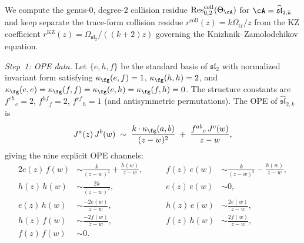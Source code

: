 \begin{computation}
\label{comp:sl2-collision-residue-kz}
We compute the genus-$0$, degree-$2$ collision residue
$\operatorname{Res}^{\mathrm{coll}}_{0,2}(\Theta_\cA)$
for $\cA = \widehat{\mathfrak{sl}}_{2,k}$ and keep separate the
trace-form collision residue
$r^{\mathrm{coll}}(z)=k\Omega_{\mathrm{tr}}/z$ from the KZ coefficient
$r^{\mathrm{KZ}}(z)=\Omega_{\mathfrak{sl}_2}/((k+2)z)$ governing the
Knizhnik--Zamolodchikov equation.

\emph{Step~1: OPE data.}
Let $\{e, h, f\}$ be the standard basis of $\mathfrak{sl}_2$
with normalized invariant form satisfying $\kappa_{\fg}(e,f) = 1$,
$\kappa_{\fg}(h,h) = 2$, and $\kappa_{\fg}(e,e) = \kappa_{\fg}(f,f) = \kappa_{\fg}(e,h)
= \kappa_{\fg}(f,h) = 0$. The structure constants are
$f^{eh}{}_e = 2$, $f^{hf}{}_f = 2$, $f^{ef}{}_h = 1$
(and antisymmetric permutations).
The OPE of $\widehat{\mathfrak{sl}}_{2,k}$ is
\begin{equation}\label{eq:sl2-collision-ope}
J^a(z)\, J^b(w) \;\sim\;
\frac{k \cdot \kappa_{\fg}(a,b)}{(z-w)^2}
\;+\;
\frac{f^{ab}{}_{c}\, J^c(w)}{z-w},
\end{equation}
giving the nine explicit OPE channels:
\begin{alignat}{2}
e(z)\,f(w) &\sim \frac{k}{(z-w)^2} + \frac{h(w)}{z-w},
 &\qquad
f(z)\,e(w) &\sim \frac{k}{(z-w)^2} - \frac{h(w)}{z-w},
 \label{eq:sl2-collision-ef} \\
h(z)\,h(w) &\sim \frac{2k}{(z-w)^2},
 &\qquad
e(z)\,e(w) &\sim 0,
 \label{eq:sl2-collision-hh} \\
e(z)\,h(w) &\sim \frac{-2e(w)}{z-w},
 &\qquad
h(z)\,e(w) &\sim \frac{2e(w)}{z-w},
 \label{eq:sl2-collision-eh} \\
h(z)\,f(w) &\sim \frac{-2f(w)}{z-w},
 &\qquad
f(z)\,h(w) &\sim \frac{2f(w)}{z-w},
 \label{eq:sl2-collision-hf} \\
f(z)\,f(w) &\sim 0. &&
 \label{eq:sl2-collision-ff}
\end{alignat}


\end{computation}
